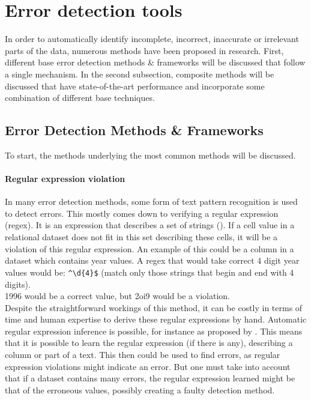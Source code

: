 \section{Error detection tools}
\label{sec:error_detection_tools}
In order to automatically identify incomplete, incorrect, inaccurate or irrelevant parts of the data, numerous methods have been proposed in research. First, different base error detection methods \& frameworks will be discussed that follow a single mechanism. In the second subsection, composite methods will be discussed that have state-of-the-art performance and incorporate some combination of different base techniques.

\subsection{Error Detection Methods \& Frameworks}
To start, the methods underlying the most common methods will be discussed.

\paragraph{Regular expression violation}
In many error detection methods, some form of text pattern recognition is used to detect errors. This mostly comes down to verifying a regular expression (regex). It is an expression that describes a set of strings (\cite{Mitkov2004-fz}). If a cell value in a relational dataset does not fit in this set describing these cells, it will be a violation of this regular expression. An example of this could be a column in a dataset which contains year values. A regex that would take correct 4 digit year values would be: \verb|^\d{4}$| (match only those strings that begin and end with 4 digits). 
\\1996 would be a correct value, but 2oi9 would be a violation. 
\\Despite the straightforward workings of this method, it can be costly in terms of time and human expertise to derive these regular expressions by hand.
Automatic regular expression inference is possible, for instance as proposed by \cite{Bartoli2016-hx}. This means that it is possible to learn the regular expression (if there is any), describing a column or part of a text. This then could be used to find errors, as regular expression violations might indicate an error. But one must take into account that if a dataset contains many errors, the regular expression learned might be that of the erroneous values, possibly creating a faulty detection method.
    
